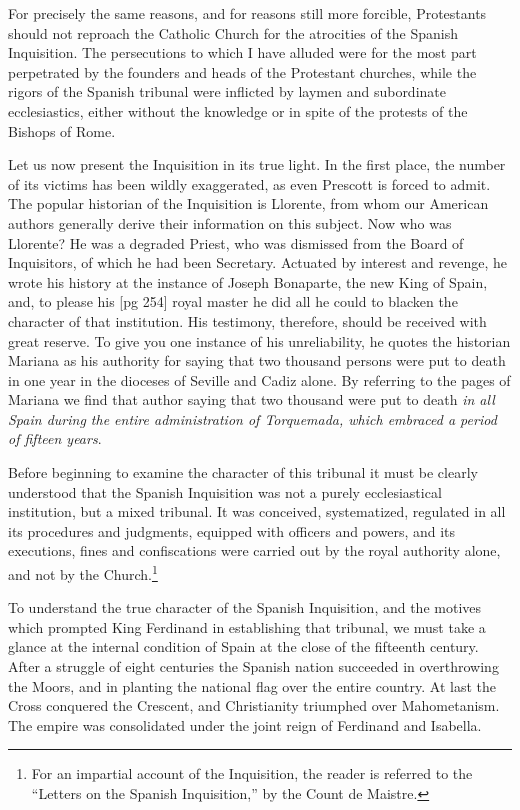 For precisely the same reasons, and for reasons
still more forcible, Protestants should not reproach
the Catholic Church for the atrocities of
the Spanish Inquisition. The persecutions to
which I have alluded were for the most part perpetrated
by the founders and heads of the Protestant
churches, while the rigors of the Spanish
tribunal were inflicted by laymen and subordinate
ecclesiastics, either without the knowledge or in
spite of the protests of the Bishops of Rome.

Let us now present the Inquisition in its true
light. In the first place, the number of its victims
has been wildly exaggerated, as even Prescott
is forced to admit. The popular historian
of the Inquisition is Llorente, from whom our
American authors generally derive their information
on this subject. Now who was Llorente? He
was a degraded Priest, who was dismissed from
the Board of Inquisitors, of which he had been
Secretary. Actuated by interest and revenge, he
wrote his history at the instance of Joseph Bonaparte,
the new King of Spain, and, to please his
[pg 254]
royal master he did all he could to blacken the
character of that institution. His testimony,
therefore, should be received with great reserve.
To give you one instance of his unreliability, he
quotes the historian Mariana as his authority for
saying that two thousand persons were put to
death in one year in the dioceses of Seville and
Cadiz alone. By referring to the pages of Mariana
we find that author saying that two thousand
were put to death \emph{in all Spain during the entire
administration of Torquemada, which embraced a
period of fifteen years}.

Before beginning to examine the character of
this tribunal it must be clearly understood that
the Spanish Inquisition was not a purely ecclesiastical
institution, but a mixed tribunal. It was
conceived, systematized, regulated in all its procedures
and judgments, equipped with officers and
powers, and its executions, fines and confiscations
were carried out by the royal authority alone,
and not by the Church.\footnote{For an impartial
account of the Inquisition, the reader is
referred to the “Letters on the Spanish Inquisition,” by the
Count de Maistre.}

To understand the true character of the Spanish
Inquisition, and the motives which prompted
King Ferdinand in establishing that tribunal, we
must take a glance at the internal condition of
Spain at the close of the fifteenth century. After
a struggle of eight centuries the Spanish nation
succeeded in overthrowing the Moors, and in
planting the national flag over the entire country.
At last the Cross conquered the Crescent,
and Christianity triumphed over Mahometanism.
The empire was consolidated under the joint reign
of Ferdinand and Isabella.

